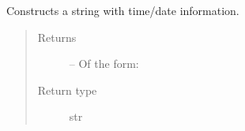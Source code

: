 \documentclass[letterpaper,10pt,english]{sphinxmanual}
\begin{document}

\begin{fulllineitems}
\label{\detokenize{references/write:nmrespy.write._timestamp}}
\sphinxAtStartPar
Constructs a string with time/date information.
\begin{quote}\begin{description}
\item[{Returns}] \leavevmode
\sphinxAtStartPar

\sphinxAtStartPar
{} – Of the form:

\begin{sphinxVerbatim}[commandchars=\\\{\}]
\end{sphinxVerbatim}


\item[{Return type}] \leavevmode
\sphinxAtStartPar
str

\end{description}\end{quote}

\end{fulllineitems}

\end{document}
